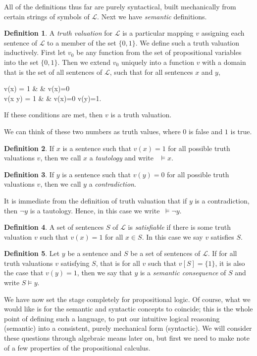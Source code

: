 \documentclass[11pt,titlepage]{article}
\newcommand{\imp}{\Rightarrow}
\newcommand{\Lan}{\mathcal{L}}
\theoremstyle{definition}
\newtheorem{definition}{Definition}[subsection]
\begin{document}
All of the definitions thus far are purely syntactical, built mechanically from certain strings of symbols of $\Lan$. Next we have {\em semantic} definitions.
\begin{definition}\label{tv} A {\em truth valuation} for $\Lan$ is a particular mapping $v$ assigning each sentence of $\Lan$ to a member of the set $\{0, 1\}$. We define such a truth valuation inductively. First let $v_0$ be any function from the set of propositional variables into the set $\{0,1\}$. Then we extend $v_0$ uniquely into a function $v$ with a domain that is the set of all sentences of $\Lan$, such that for all sentences $x$ and $y$, 
\begin{EQA}[lcl]
	v(\neg x) = 1 & \qquad {} \qquad & v(x)=0 \\
	v(x \imp y) = 1 & \qquad {} \qquad & v(x)=0 \quad{} \quad v(y)=1.
\end{EQA} If these conditions are met, then $v$ is a truth valuation.
\end{definition}
We can think of these two numbers as truth values, where $0$ is false and $1$ is true.
\begin{definition} If $x$ is a sentence such that $v(x)=1$ for all possible truth valuations $v$, then we call $x$ a {\em tautology} and write \ $\vDash x.$\end{definition}
\begin{definition} If $y$ is a sentence such that $v(y)=0$ for all possible truth valuations $v$, then we call $y$ a {\em contradiction}.\end{definition} It is immediate from the definition of truth valuation that if $y$ is a contradiction, then $\neg y$ is a tautology. Hence, in this case we write $\ \vDash \neg y$.
\begin{definition} A set of sentences $S$ of $\Lan$ is {\em satisfiable} if there is some truth valuation $v$ such that $v(x)=1$ for all $x\in S$. In this case we say $v$ satisfies $S$.\end{definition}
\begin{definition}\label{s_c} Let $y$ be a sentence and $S$ be a set of sentences of $\Lan$. If for all truth valuations $v$ satisfying $S$, that is for all $v$ such that $v[S]=\{1\}$, it is also the case that $v(y)=1$, then we say that $y$ is a {\em semantic consequence} of $S$  and write $S\vDash y$.\end{definition}

We have now set the stage completely for propositional logic. Of course, what we would like is for the semantic and syntactic concepts to coincide; this is the whole point of defining such a language, to put our intuitive logical reasoning (semantic) into a consistent, purely mechanical form (syntactic). We will consider these questions through algebraic means later on, but first we need to make note of a few properties of the propositional calculus.
\end{document}

